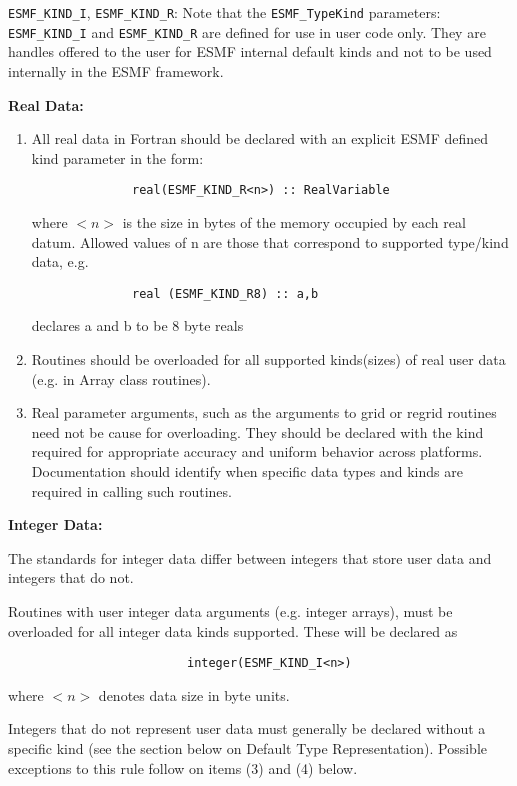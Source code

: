 {\tt ESMF\_KIND\_I}, {\tt ESMF\_KIND\_R}: Note that the {\tt ESMF\_TypeKind} parameters: {\tt ESMF\_KIND\_I} and {\tt ESMF\_KIND\_R} are defined for use in user code only. They are handles offered to the user for ESMF internal default kinds and not to be used internally in the ESMF framework.

{\bf Real Data:}
\begin{enumerate}
\item All real data in Fortran should be declared with an explicit ESMF defined kind parameter in the form:
\begin{verbatim}
              real(ESMF_KIND_R<n>) :: RealVariable
\end{verbatim}

      where $<n>$ is the size in bytes of the memory occupied by each real datum. Allowed values of n are those that correspond to supported type/kind data, e.g.
\begin{verbatim}
              real (ESMF_KIND_R8) :: a,b
\end{verbatim}
      declares a and b to be 8 byte reals

\item Routines should be overloaded for all supported kinds(sizes) of real user data (e.g. in Array class routines).

\item Real parameter arguments, such as the arguments to grid or regrid routines need not be cause for overloading. They should be declared with the kind required for appropriate accuracy and uniform behavior across platforms. Documentation should identify when specific data types and kinds are required in calling such routines.
\end{enumerate}

{\bf Integer Data:}

The standards for integer data differ between integers that store user data and integers that do not.

Routines with user integer data arguments (e.g. integer arrays), must be overloaded for all integer data kinds supported. These will be declared as
\begin{verbatim}
                         integer(ESMF_KIND_I<n>)
\end{verbatim}
where $<n>$ denotes data size in byte units.

Integers that do not represent user data must generally be declared without a specific kind (see the section below on Default Type Representation). Possible exceptions to this rule follow on items (3) and (4) below.

